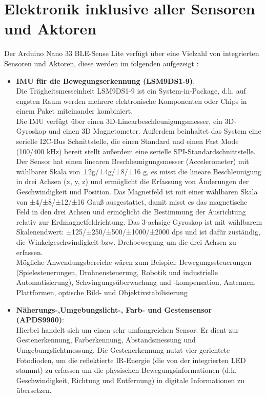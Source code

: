 \section{Elektronik inklusive aller Sensoren und Aktoren}
Der Arduino Nano 33 BLE-Sense Lite verfügt über eine Vielzahl von integrierten Sensoren und Aktoren, diese werden im folgenden aufgezeigt \cite{ArdSense.2023}:
\begin{itemize}
	\item \textbf{IMU für die Bewegungserkennung (LSM9DS1-9)}:\\
	Die Trägheitsmesseinheit LSM9DS1-9 ist ein System-in-Package, d.h. auf engsten Raum werden mehrere elektronische Komponenten oder Chips in einem Paket miteinander kombiniert.\cite{Wagner.2013} \\Die IMU  verfügt über einen 3D-Linearbeschleunigungsmesser, ein 3D-Gyroskop und einen 3D Magnetometer. Außerdem beinhaltet das System eine serielle I2C-Bus Schnittstelle, die einen Standard und einen Fast Mode (100/400 kHz) bereit stellt außerdem eine serielle SPI-Standardschnittstelle. 
	Der Sensor hat einen linearen Beschleunigungsmesser (Accelerometer) mit wählbarer Skala von ±2g/±4g/±8/±16 g, es misst die lineare Beschleunigung in drei Achsen (x, y, z) und ermöglicht die Erfassung von Änderungen der Geschwindigkeit und Position. Das Magnetfeld ist mit einer wählbaren Skala von ±4/±8/±12/±16 Gauß ausgestattet, damit misst es das magnetische Feld in den drei Achsen und ermöglicht die Bestimmung der Ausrichtung relativ zur Erdmagnetfeldrichtung. Das 3-achsige Gyroskop ist mit wählbarem Skalenendwert: ±125/±250/±500/±1000/±2000 dps und ist dafür zuständig, die Winkelgeschwindigkeit bzw. Drehbewegung um die drei Achsen zu erfassen. \cite{StmicrElec.2015}
	\\Mögliche Anwendungsbereiche wären zum Beispiel: Bewegungssteuerungen (Spielesteuerungen, Drohnensteuerung, Robotik und industrielle Automatisierung), Schwingungsüberwachung und -kompensation, Antennen, Plattformen, optische Bild- und Objektivstabilisierung  
	\\
	\item \textbf{Näherungs-,Umgebungslicht-, Farb- und Gestensensor \\ (APDS9960)}:\\
	Hierbei handelt sich um einen sehr umfangreichen Sensor. Er dient zur Gestenerkennung, Farberkennung, Abstandsmessung und Umgebungslichtmessung. Die Gestenerkennung nutzt vier gerichtete Fotodioden, um die reflektierte IR-Energie (die von der integrierten LED stammt) zu erfassen um die physischen Bewegungsinformationen (d.h. Geschwindigkeit, Richtung und Entfernung) in digitale Informationen zu übersetzen.\\

\end{itemize}

